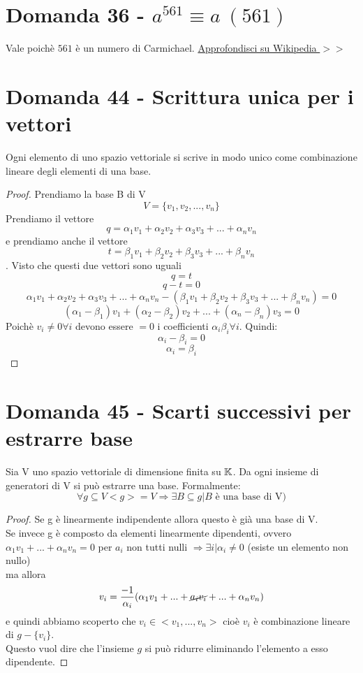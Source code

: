 \documentclass[]{article}
\begin{document}
\section{Domanda 36 - $a^{561} \equiv a\ (561)$}
Vale poichè $561$ è un numero di Carmichael. 
\href{http://it.wikipedia.org/wiki/Numero_di_Carmichael}{Approfondisci su Wikipedia $>>$}
\section{Domanda 44 - Scrittura unica per i vettori}
\begin{lem}
Ogni elemento di uno spazio vettoriale si scrive in modo unico come combinazione lineare degli elementi di una base.
\end{lem}
\begin{proof}
Prendiamo la base B di V $$V = \{v_1, v_2, ..., v_n\}$$
Prendiamo il vettore $$q = \alpha_1 v_1 + \alpha_2 v_2 + \alpha_3 v_3 +...+ \alpha_n v_n$$ e prendiamo anche il vettore $$t = \beta_1v_1+\beta_2v_2+\beta_3v_3+...+ \beta_nv_n$$. Visto che questi due vettori sono uguali 
$$q= t$$
$$q-t = 0$$
$$\alpha_1 v_1 + \alpha_2 v_2 + \alpha_3 v_3 +...+ \alpha_n v_n - ( \beta_1v_1+\beta_2v_2+\beta_3v_3+...+ \beta_nv_n ) = 0$$
$$(\alpha_1-\beta_1)v_1+(\alpha_2-\beta_2)v_2+...+(\alpha_n-\beta_n)v_3=0$$
Poichè $v_i \not= 0 \forall i$ devono essere $=0$ i coefficienti $\alpha_i\beta_i \forall i$. Quindi: $$\alpha_i-\beta_i=0$$ $$\alpha_i=\beta_i$$
\end{proof}
\section{Domanda 45 - Scarti successivi per estrarre base}
\begin{lem}
	Sia V uno spazio vettoriale di dimensione finita su $\mathbb{K}$. Da ogni insieme di generatori di V si può estrarre una base. Formalmente: $$\forall g \subseteq V <g> = V \Rightarrow \exists B \subseteq g | B \text{ è una base di V})$$
\end{lem}
\begin{proof}
	Se g è linearmente indipendente allora questo è già una base di V.\\
	Se invece g è composto da elementi linearmente dipendenti, ovvero $\alpha_1v_1+...+\alpha_nv_n=0$ per $a_i$ non tutti nulli $\Rightarrow \exists i | \alpha_i \not= 0$ (esiste un elemento non nullo) \\ ma allora $$v_i = \frac{-1}{\alpha_i}(\alpha_1v_1+...+\cancel{a_iv_i}+...+\alpha_nv_n)$$ e quindi abbiamo scoperto che $v_i \in <v_1, ..., v_n>$ cioè $v_i$ è combinazione lineare di $ g - \{v_i\}$. \\Questo vuol dire che l'insieme $g$ si può ridurre eliminando l'elemento a esso dipendente.
\end{proof}
\end{document}
